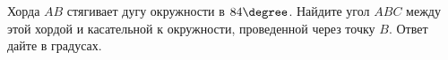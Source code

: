 \begin{ex}
	\begin{condition}
		Хорда \( AB \)  стягивает дугу окружности в \( 84 \degree\). Найдите угол \( ABC \)  между этой хордой и касательной к окружности, проведенной через точку \( B \). Ответ дайте в градусах.
	\end{condition}
\end{ex}